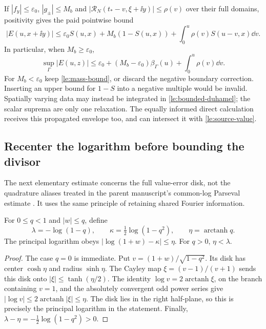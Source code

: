 If $|f_y|\le\varepsilon_0$, $|g_\pm|\le M_b$ and
$|\mathcal R_N(t_*-v,\xi+\ii y)|\le\rho(v)$ over their full domains,
positivity gives the paid pointwise bound
\begin{equation}
 |E(u,x+\ii y)|\le\varepsilon_0S(u,x)+M_b(1-S(u,x))
                +\int_0^u\rho(v)S(u-v,x)\dd v.
 \label{le:mass-bound}
\end{equation}
In particular, when $M_b\ge\varepsilon_0$,
\begin{equation}
 \sup_\Gamma|E(u,z)|\le\varepsilon_0+
          (M_b-\varepsilon_0)\beta_\Gamma(u)+\int_0^u\rho(v)\dd v.
 \label{le:scalar-heat}
\end{equation}
For $M_b<\varepsilon_0$ keep \eqref{le:mass-bound}, or discard the
negative boundary correction. Inserting an upper bound for $1-S$ into
a negative multiple would be invalid. Spatially varying data may instead
be integrated in \eqref{le:bounded-duhamel}; the scalar suprema are only
one relaxation. The equally informed direct calculation receives this
propagated envelope too, and can intersect it with \eqref{le:source-value}.

\subsection{Recenter the logarithm before bounding the divisor}

The next elementary estimate concerns the full value-error disk, not
the quadrature aliases treated in the parent manuscript's common-log
Parseval estimate \cite[\S22]{VCDCMManuscript}. It uses the same principle
of retaining shared Fourier information.

\begin{lemma}\label{le:log-disk}
For $0\le q<1$ and $|w|\le q$, define
\[
 \lambda=-\log(1-q),\qquad
 \kappa=\tfrac12\log(1-q^2),\qquad
 \eta=\operatorname{arctanh}q.
\]
The principal logarithm obeys
$|\log(1+w)-\kappa|\le\eta$. For $q>0$, $\eta<\lambda$.
\end{lemma}
\begin{proof}
The case $q=0$ is immediate. Put $v=(1+w)/\sqrt{1-q^2}$.
Its disk has center $\cosh\eta$ and radius $\sinh\eta$.
The Cayley map $\xi=(v-1)/(v+1)$ sends this disk onto
$|\xi|\le\tanh(\eta/2)$. The identity
$\log v=2\operatorname{arctanh}\xi$, on the branch containing $v=1$,
and the absolutely convergent odd power series give
$|\log v|\le2\operatorname{arctanh}|\xi|\le\eta$.
The disk lies in the right half-plane, so this is precisely the
principal logarithm in the statement. Finally,
$\lambda-\eta=-\tfrac12\log(1-q^2)>0$.
\end{proof}

